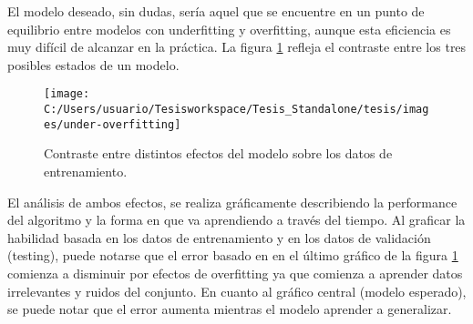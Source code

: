 El modelo deseado, sin dudas, sería aquel que se encuentre en un punto
de equilibrio entre modelos con underfitting y overfitting, aunque
esta eficiencia es muy difícil de alcanzar en la práctica. La figura
\ref{fig:under-overfitting} refleja el contraste entre los tres posibles
estados de un modelo. 

\begin{figure}
\begin{centering}
\texttt{[image: C:/Users/usuario/Tesisworkspace/Tesis\_Standalone/tesis/images/under-overfitting]}
\par\end{centering}

\caption{Contraste entre distintos efectos del modelo sobre los datos de entrenamiento.\label{fig:under-overfitting}}
\end{figure}


El análisis de ambos efectos, se realiza gráficamente describiendo
la performance del algoritmo y la forma en que va aprendiendo a través
del tiempo. Al graficar la habilidad basada en los datos de entrenamiento
y en los datos de validación (testing), puede notarse que el error
basado en en el último gráfico de la figura \ref{fig:under-overfitting}
comienza a disminuir por efectos de overfitting ya que comienza a
aprender datos irrelevantes y ruidos del conjunto. En cuanto al gráfico
central (modelo esperado), se puede notar que el error aumenta mientras
el modelo aprender a generalizar. 

  
